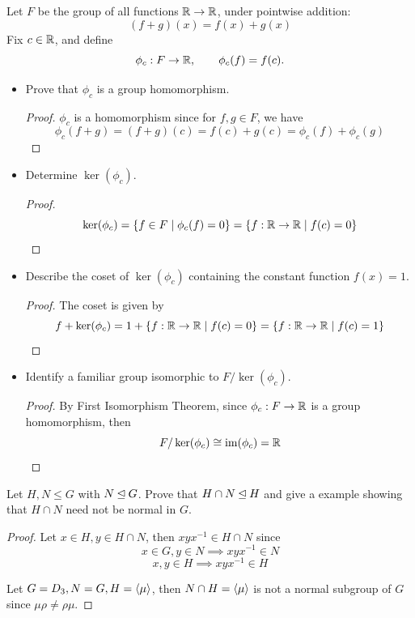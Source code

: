 \documentclass[12pt,a4paper]{article}
\begin{document}
    \begin{ex}
        Let $F$ be the group of all functions $\mathbb{R}\to\mathbb{R}$, under pointwise addition:
        \[
            (f+g)(x)=f(x)+g(x)
        \]
        Fix $c\in\mathbb{R}$, and define
        \[
            \phi_c:F\to\mathbb{R},\qquad \phi_c(f)=f(c).
        \]
        \begin{itemize}
            \item Prove that $\phi_c$ is a group homomorphism.
            \begin{proof}
                $\phi_c$ is a homomorphism since for $f,g\in F$, we have
                \[
                    \phi_c(f+g)=(f+g)(c)=f(c)+g(c)=\phi_c(f)+\phi_c(g)
                \]
            \end{proof}
            \item Determine $\ker(\phi_c)$.
            \begin{proof}
                \[
                    \ker(\phi_c)=\left\{ f\in F\mid\phi_c(f)=0 \right\}=\left\{ f:\mathbb{R}\to\mathbb{R}\mid f(c)=0 \right\}
                \]
            \end{proof}
            \item Describe the coset of $\ker(\phi_c)$ containing the constant function $f(x)=1$.
            \begin{proof}
                The coset is given by 
                \[
                    f+\ker(\phi_c)=1+\left\{ f:\mathbb{R}\to\mathbb{R}\mid f(c)=0 \right\}=\left\{ f:\mathbb{R}\to\mathbb{R}\mid f(c)=1 \right\}
                \]
            \end{proof}
            \item Identify a familiar group isomorphic to $F/\ker(\phi_c)$.
            \begin{proof}
                By First Isomorphism Theorem, since $\phi_c:F\to\mathbb{R}$ is a group homomorphism, then
                \[
                    F/\ker(\phi_c)\cong\operatorname{im}(\phi_c)=\mathbb{R}
                \]
            \end{proof}
        \end{itemize}
    \end{ex}
    \bigskip

    \begin{ex}
        Let $H,N\leq G$ with $N\unlhd G$. Prove that $H\cap N\unlhd H$ and give a example showing that $H\cap N$ need not be normal in $G$.
    \end{ex}
    \begin{proof}
        Let $x\in H,y\in H\cap N$, then $xyx^{-1}\in H\cap N$ since
        \[
            x\in G,y\in N\implies xyx^{-1}\in N
        \]
        \[
            x,y\in H\implies xyx^{-1}\in H
        \]

        Let $G=D_3,N=G,H=\langle \mu \rangle$, then $N\cap H=\langle \mu \rangle$ is not a normal subgroup of $G$ since $\mu\rho\neq\rho\mu$.
    \end{proof}
    \bigskip
\end{document}
